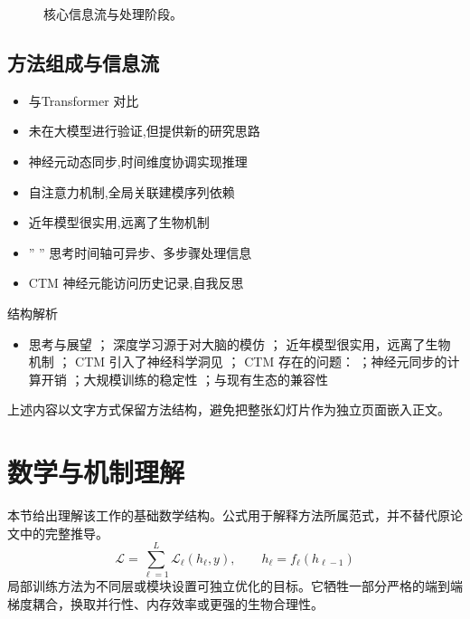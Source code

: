\documentclass[UTF8,11pt,a4paper]{ctexart}
\begin{document}
\begin{figure}[H]
\centering
{}
\caption{核心信息流与处理阶段。}
\end{figure}

\subsection{方法组成与信息流}
\begin{itemize}
\item 与Transformer 对比
\item 未在大模型进行验证,但提供新的研究思路
\item 神经元动态同步,时间维度协调实现推理
\item 自注意力机制,全局关联建模序列依赖
\item 近年模型很实用,远离了生物机制
\item ” ” 思考时间轴可异步、多步骤处理信息
\item CTM 神经元能访问历史记录,自我反思
\end{itemize}

\begin{keybox}{结构解析}
\begin{itemize}
\item 思考与展望 ； 深度学习源于对大脑的模仿 ； 近年模型很实用，远离了生物机制 ； CTM 引入了神经科学洞见 ； CTM 存在的问题： ；神经元同步的计算开销 ；大规模训练的稳定性 ；与现有生态的兼容性
\end{itemize}
\end{keybox}

上述内容以文字方式保留方法结构，避免把整张幻灯片作为独立页面嵌入正文。

\section{数学与机制理解}
本节给出理解该工作的基础数学结构。公式用于解释方法所属范式，并不替代原论文中的完整推导。
\begin{equation}
\mathcal L=\sum_{\ell=1}^{L}\mathcal L_\ell(h_\ell,y),\qquad h_\ell=f_\ell(h_{\ell-1})
\end{equation}
局部训练方法为不同层或模块设置可独立优化的目标。它牺牲一部分严格的端到端梯度耦合，换取并行性、内存效率或更强的生物合理性。
\end{document}
